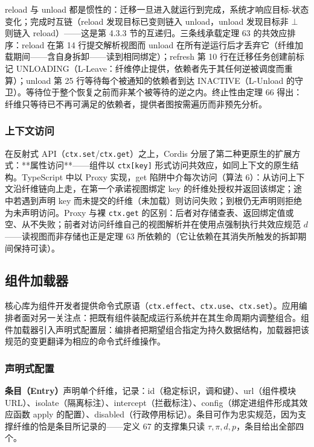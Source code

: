 \documentclass[11pt,a4paper]{article}
\theoremstyle{plain}
\theoremstyle{definition}
\theoremstyle{remark}
\begin{document}
reload 与 unload 都是惯性的：迁移一旦进入就运行到完成，系统才响应目标-状态变化；完成时互链（reload 发现目标已变则链入 unload，unload 发现目标非 $\bot$ 则链入 reload）——这是第 4.3.3 节的互递归。三条线承载定理 63 的共效应排序：reload 在第 14 行提交解析视图而 unload 在所有逆运行后才丢弃它（纤维加载期间——含自身拆卸——读到相同绑定）；refresh 第 10 行在迁移任务创建前标记 UNLOADING（L-Leave：纤维停止提供，依赖者先于其任何逆被调度而重算）；unload 第 25 行等待每个被通知的依赖者到达 INACTIVE（L-Unload 的守卫）。等待位于整个恢复之前而非某个被等待的逆之内。终止性由定理 66 得出：纤维只等待已不再可满足的依赖者，提供者图按需遍历而非预先分析。

\subsubsection{上下文访问}

在反射式 API（\texttt{ctx.set}/\texttt{ctx.get}）之上，Cordis 分层了第二种更原生的扩展方式：**属性访问**——组件以 \texttt{ctx[key]} 形式访问共效应，如同上下文的原生结构。TypeScript 中以 Proxy 实现，get 陷阱中介每次访问（算法 6）：从访问上下文沿纤维链向上走，在第一个承诺视图绑定 key 的纤维处授权并返回该绑定；途中若遇到声明 key 而未提交的纤维（未加载）则访问失败；到根仍无声明则拒绝为未声明访问。Proxy 与裸 \texttt{ctx.get} 的区别：后者对存储查表、返回绑定值或空、从不失败；前者对访问纤维自己的视图解析并在使用点强制执行共效应规范 $d$——读视图而非存储也正是定理 63 所依赖的（它让依赖在其消失所触发的拆卸期间保持可读）。

\subsection{组件加载器}

核心库为组件开发者提供命令式原语（\texttt{ctx.effect}、\texttt{ctx.use}、\texttt{ctx.set}）。应用编排者面对另一关注点：把既有组件装配成运行系统并在其生命周期内调整组合。组件加载器引入声明式配置层：编排者把期望组合指定为持久数据结构，加载器把该规范的变更翻译为相应的命令式纤维操作。

\subsubsection{声明式配置}

\textbf{条目（Entry）}声明单个纤维，记录：id（稳定标识，调和键）、url（组件模块 URL）、isolate（隔离标注）、intercept（拦截标注）、config（绑定进组件形成其效应函数 apply 的配置）、disabled（行政停用标记）。条目可作为忠实规范，因为支撑纤维的恰是条目所记录的——定义 67 的支撑集只读 $\tau, \pi, d, p$，条目给出全部四个。
\end{document}

